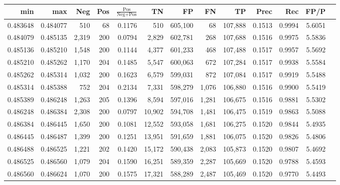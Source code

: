 \begin{tabular}{rrrrrrrrrrrrr}
\toprule
     min &      max &   Neg & Pos & $\frac{\text{Pos}}{\text{Neg}+\text{Pos}}$ &      TN &      FP &      FN &      TP &   Prec &    Rec &   FP/P \\
\midrule
0.483648 & 0.484077 &   510 &  68 &                                     0.1176 &     510 & 605,100 &      68 & 107,888 & 0.1513 & 0.9994 & 5.6051 \\
0.484079 & 0.485135 & 2,319 & 200 &                                     0.0794 &   2,829 & 602,781 &     268 & 107,688 & 0.1516 & 0.9975 & 5.5836 \\
0.485136 & 0.485210 & 1,548 & 200 &                                     0.1144 &   4,377 & 601,233 &     468 & 107,488 & 0.1517 & 0.9957 & 5.5692 \\
0.485210 & 0.485262 & 1,170 & 204 &                                     0.1485 &   5,547 & 600,063 &     672 & 107,284 & 0.1517 & 0.9938 & 5.5584 \\
0.485262 & 0.485314 & 1,032 & 200 &                                     0.1623 &   6,579 & 599,031 &     872 & 107,084 & 0.1517 & 0.9919 & 5.5488 \\
0.485314 & 0.485388 &   752 & 204 &                                     0.2134 &   7,331 & 598,279 &   1,076 & 106,880 & 0.1516 & 0.9900 & 5.5419 \\
0.485389 & 0.486248 & 1,263 & 205 &                                     0.1396 &   8,594 & 597,016 &   1,281 & 106,675 & 0.1516 & 0.9881 & 5.5302 \\
0.486248 & 0.486384 & 2,308 & 200 &                                     0.0797 &  10,902 & 594,708 &   1,481 & 106,475 & 0.1519 & 0.9863 & 5.5088 \\
0.486384 & 0.486445 & 1,650 & 200 &                                     0.1081 &  12,552 & 593,058 &   1,681 & 106,275 & 0.1520 & 0.9844 & 5.4935 \\
0.486445 & 0.486487 & 1,399 & 200 &                                     0.1251 &  13,951 & 591,659 &   1,881 & 106,075 & 0.1520 & 0.9826 & 5.4806 \\
0.486488 & 0.486525 & 1,221 & 202 &                                     0.1420 &  15,172 & 590,438 &   2,083 & 105,873 & 0.1520 & 0.9807 & 5.4692 \\
0.486525 & 0.486560 & 1,079 & 204 &                                     0.1590 &  16,251 & 589,359 &   2,287 & 105,669 & 0.1520 & 0.9788 & 5.4593 \\
0.486560 & 0.486624 & 1,070 & 200 &                                     0.1575 &  17,321 & 588,289 &   2,487 & 105,469 & 0.1520 & 0.9770 & 5.4493 \\

\end{tabular}
